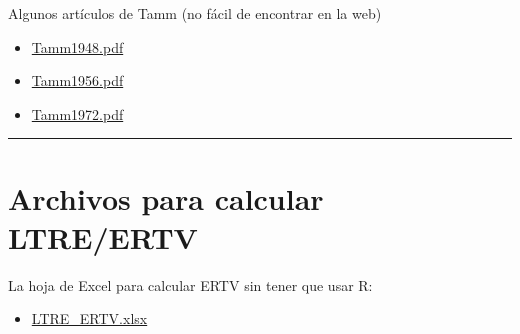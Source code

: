 \documentclass[
  12pt,
  letterpaper,
]{book}
\providecommand{\tightlist}{%
  \setlength{\itemsep}{0pt}\setlength{\parskip}{0pt}}\usepackage{longtable,booktabs,array}
\begin{document}
Algunos artículos de Tamm (no fácil de encontrar en la web)

\begin{itemize}
\tightlist
\item
  \href{PDF_Dinamica_Poblacional/Tamm1948.pdf}{Tamm1948.pdf}
\item
  \href{PDF_Dinamica_Poblacional/Tamm1956.pdf}{Tamm1956.pdf}
\item
  \href{PDF_Dinamica_Poblacional/Tamm1972.pdf}{Tamm1972.pdf}
\end{itemize}

\begin{center}\rule{0.5\linewidth}{0.5pt}\end{center}

\chapter{Archivos para calcular
LTRE/ERTV}\label{archivos-para-calcular-ltreertv}

La hoja de Excel para calcular ERTV sin tener que usar R:

\begin{itemize}
\tightlist
\item
  \href{data/LTRE_ERTV.xlsx}{LTRE\_ERTV.xlsx}
\end{itemize}


\backmatter
\end{document}

